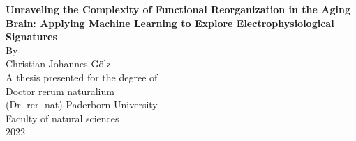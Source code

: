 \begin{titlepage}
    \begin{center}
        \vspace*{1cm}
        \LARGE
        \textbf{Unraveling the Complexity of Functional Reorganization in the Aging Brain: Applying Machine Learning to Explore Electrophysiological Signatures}\\
        \vspace{1.5cm}
        \Large
        By\\
        \vspace{0.5cm}
        Christian Johannes Gölz\\
        \vspace{0.5cm}       
        A thesis presented for the degree of\\
        Doctor rerum naturalium\\
        (Dr. rer. nat)
        \vfill
        \Large
        Paderborn University\\
        Faculty of natural sciences\\
        2022
            
    \end{center}
\end{titlepage}


